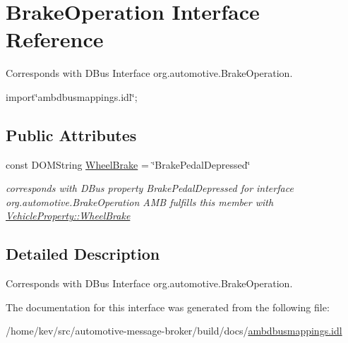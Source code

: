 \hypertarget{interfaceBrakeOperation}{\section{Brake\+Operation Interface Reference}
\label{interfaceBrakeOperation}
}


Corresponds with D\+Bus Interface org.\+automotive.\+Brake\+Operation.  




{\ttfamily import\char`\"{}ambdbusmappings.\+idl\char`\"{};}

\subsection*{Public Attributes}
\begin{DoxyCompactItemize}
\item 
\hypertarget{interfaceBrakeOperation_ad73cf8b7d7f23278303ecdbeaeb7a62b}{const D\+O\+M\+String \hyperlink{interfaceBrakeOperation_ad73cf8b7d7f23278303ecdbeaeb7a62b}{Wheel\+Brake} = \char`\"{}Brake\+Pedal\+Depressed\char`\"{}}\label{interfaceBrakeOperation_ad73cf8b7d7f23278303ecdbeaeb7a62b}

\begin{DoxyCompactList}\small\item\em corresponds with D\+Bus property Brake\+Pedal\+Depressed for interface org.\+automotive.\+Brake\+Operation A\+M\+B fulfills this member with \hyperlink{classVehicleProperty_ad4f1ec038bee5ef30fbf8308aaba2794}{Vehicle\+Property\+::\+Wheel\+Brake} \end{DoxyCompactList}\end{DoxyCompactItemize}


\subsection{Detailed Description}
Corresponds with D\+Bus Interface org.\+automotive.\+Brake\+Operation. 

The documentation for this interface was generated from the following file\+:\begin{DoxyCompactItemize}
\item 
/home/kev/src/automotive-\/message-\/broker/build/docs/\hyperlink{ambdbusmappings_8idl}{ambdbusmappings.\+idl}\end{DoxyCompactItemize}
